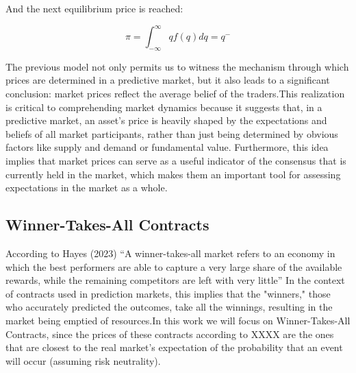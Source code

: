 And the next equilibrium price is reached:

\begin{equation}
    \pi = \int_{-\infty}^{\infty} q f(q) dq = q^-
\end{equation}

The previous model not only permits us to witness the mechanism through which prices are determined in a predictive market, but it also leads to a significant conclusion: market prices reflect the average belief of the traders.This realization is critical to comprehending market dynamics because it suggests that, in a predictive market, an asset's price is heavily shaped by the expectations and beliefs of all market participants, rather than just being determined by obvious factors like supply and demand or fundamental value. Furthermore, this idea implies that market prices can serve as a useful indicator of the consensus that is currently held in the market, which makes them an important tool for assessing expectations in the market as a whole. 

\subsection{Winner-Takes-All Contracts}
\label{subsec:winner_takes_all_contracts}

According to Hayes (2023) “A winner-takes-all market refers to an economy in which the best performers are able to capture a very large share of the available rewards, while the remaining competitors are left with very little” In the context of contracts used in prediction markets, this implies that the "winners," those who accurately predicted the outcomes, take all the winnings, resulting in the market being emptied of resources.In this work we will focus on Winner-Takes-All Contracts, since the prices of these contracts according to XXXX are the ones that are closest to the real market's expectation of the probability that an event will occur (assuming risk neutrality).

